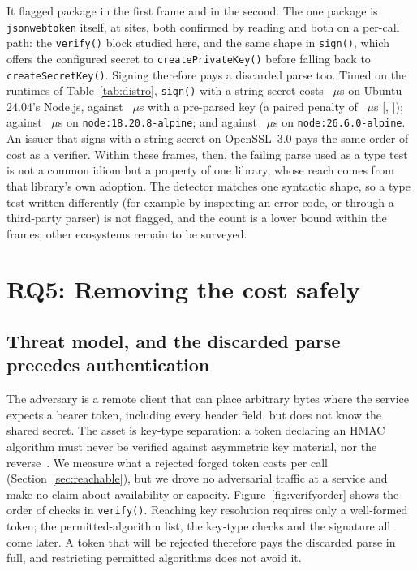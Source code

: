 \documentclass[preprint,12pt,authoryear]{elsarticle}
\newcommand{\LibraryName}{\texttt{jsonwebtoken}}
\begin{document}
It flagged \LibJwtPkgsAnyHit{} package in the first frame and
\LibCryptoPkgsAnyHit{} in the second. The one package is \LibraryName{}
itself, at \LibJwtConfirmed{} sites, both confirmed by reading and both on a
per-call path: the \texttt{verify()} block studied here, and the same shape in
\texttt{sign()}, which offers the configured secret to
\texttt{createPrivateKey()} before falling back to \texttt{createSecretKey()}.
Signing therefore pays a discarded parse too. Timed on the runtimes of
Table~\ref{tab:distro}, \texttt{sign()} with a string secret costs
\DistroUbuntuSignString~$\mu$s on Ubuntu 24.04's Node.js, against
\DistroUbuntuSignPreparsed~$\mu$s with a pre-parsed key (a paired penalty of
\DistroUbuntuSignPenalty~$\mu$s [\DistroUbuntuSignPenaltyCiLo,
\DistroUbuntuSignPenaltyCiHi]); \DistroRefEighteenSignString{} against
\DistroRefEighteenSignPreparsed~$\mu$s on \texttt{node:18.20.8-alpine}; and
\DistroRefTwentySixSignString{} against \DistroRefTwentySixSignPreparsed~$\mu$s
on \texttt{node:26.6.0-alpine}. An issuer that signs with a string secret on
OpenSSL~3.0 pays the same order of cost as a verifier. Within these
frames, then, the failing parse used as a type test is not a common idiom but a
property of one library, whose reach comes from that library's own adoption.
The detector matches one syntactic shape, so a type test written differently
(for example by inspecting an error code, or through a third-party parser) is
not flagged, and the count is a lower bound within the frames; other
ecosystems remain to be surveyed.

\section{RQ5: Removing the cost safely}\label{sec:security}

\subsection{Threat model, and the discarded parse precedes authentication}\label{sec:threatmodel}\label{sec:preauth}

The adversary is a remote client that can place arbitrary bytes where the
service expects a bearer token, including every header field, but does not know
the shared secret. The asset is key-type separation: a token declaring an HMAC
algorithm must never be verified against asymmetric key material, nor the
reverse~\citep{rfc8725}. We measure what a rejected forged token costs per
call (Section~\ref{sec:reachable}), but we drove no adversarial traffic at a
service and make no claim about availability or capacity. Figure~\ref{fig:verifyorder} shows the order of checks in
\texttt{verify()}. Reaching key resolution requires only a well-formed token;
the permitted-algorithm list, the key-type checks and the signature all come
later. A token that will be rejected therefore pays the discarded parse in
full, and restricting permitted algorithms does not avoid it.
\end{document}

